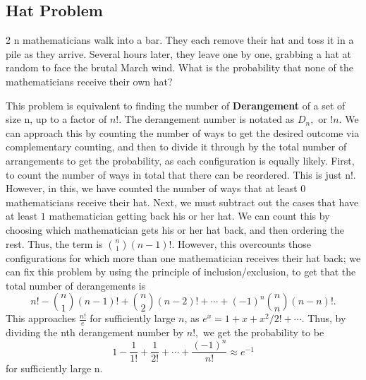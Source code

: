 \subsection{Hat Problem}
\begin{problem}
	2 n mathematicians walk into a bar. They each remove their hat and toss it in a pile as they arrive. Several hours later, they leave one by one, grabbing a hat at random to face the brutal March wind. What is the probability that none of the mathematicians receive their own hat?
\end{problem}
\begin{solution}
	This problem is equivalent to finding the number of \textbf{Derangement} of a set of size n, up to a factor of $n!$. The derangement number is notated as $D_n,$ or $!n.$
	\newline
	We can approach this by counting the number of ways to get the desired outcome via complementary counting, and then to divide it through by the total number of arrangements to get the probability, as each configuration is equally likely. First, to count the number of ways in total that there can be reordered. This is just n!. However, in this, we have counted the number of ways that at least $0$ mathematicians receive their hat. Next, we must subtract out the cases that have at least $1$ mathematician getting back his or her hat. We can count this by choosing which mathematician gets his or her hat back, and then ordering the rest. Thus, the term is $\binom n 1\left(n-1\right)!.$ However, this overcounts those configurations for which more than one mathematician receives their hat back; we can fix this problem by using the principle of inclusion/exclusion, to get that the total number of derangements is \[n!-\binom n 1\left(n-1\right)!+\binom n 2\left(n-2\right)!+\cdots+(-1)^n\binom n n\left(n-n\right)!.\]
	This approaches $\frac{n!}{e}$ for sufficiently large $n$, as $e^x=1+x+x^2/2!+\cdots.$ Thus, by dividing the nth derangement number by $n!,$ we get the probability to be \[1-\frac{1}{1!}+\frac{1}{2!}+\cdots+\frac{(-1)^n}{n!}\approx e^{-1}\] for sufficiently large n.
\end{solution}
